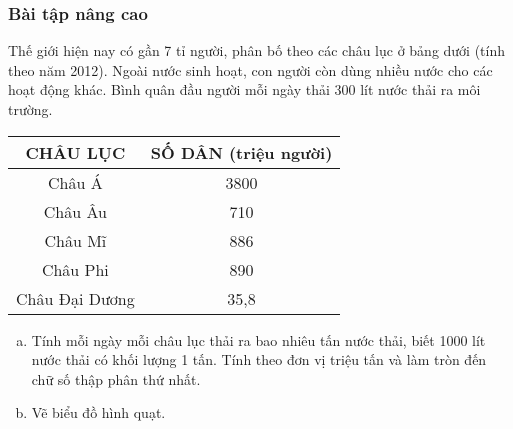\subsubsection{Bài tập nâng cao}

\begin{bt}%
	Thế giới hiện nay có gần 7 tỉ người, phân bố theo các châu lục ở bảng dưới (tính theo năm 2012). Ngoài nước sinh hoạt, con người còn dùng nhiều nước cho các hoạt động khác. Bình quân đầu người mỗi ngày thải 300 lít nước thải ra môi trường.
	\begin{center}
		
		\begin{tabular}{|c|c|}
			\hline
			CHÂU LỤC & SỐ DÂN (triệu người)\\
			\hline
			Châu Á & 3800\\
			\hline
			Châu Âu & 710\\
			\hline
			Châu Mĩ & 886\\
			\hline
			Châu Phi & 890\\
			\hline
			Châu Đại Dương & 35,8\\
			\hline
		\end{tabular}
	\end{center}
	\begin{enumerate}[a)]
		\item Tính mỗi ngày mỗi châu lục thải ra bao nhiêu tấn nước thải, biết 1000 lít nước thải có khối lượng 1 tấn. Tính theo đơn vị triệu tấn và làm tròn đến chữ số thập phân thứ nhất.
		\item Vẽ biểu đồ hình quạt.
	\end{enumerate}
\end{bt}

